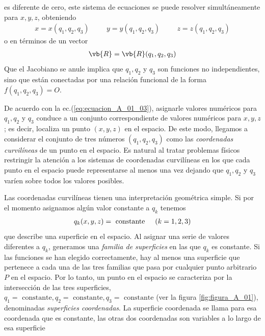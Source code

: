 es diferente de cero, este sistema de ecuaciones se puede resolver simultáneamente para $x, y, z$, obteniendo
\begin{align}
x = x (q_{1}, q_{2}, q_ {3}) \hspace{1cm} y = y (q_{1}, q_{2}, q_ {3}) \hspace{1cm} z = z (q_{1}, q_{2}, q_ {3})
\label{eq:ecuacion_A_01_03}    
\end{align}
o en términos de un vector
\begin{align*}
\vb{R} = \vb{R} (q_{1}, q_{2}, q_{3})
\end{align*}
Que el Jacobiano se anule implica que $q_{1}, q_{2}$ y $q_{3}$ son funciones no independientes, sino que están conectadas por una relación funcional de la forma $f (q_{1}, q_{2}, q_{3}) = O$.
\par
De acuerdo con la ec.(\ref{eq:ecuacion_A_01_03}), asignarle valores numéricos para $q_{1}, q_{2}$ y $q_{3}$ conduce a un conjunto correspondiente de valores numéricos para $x, y, z$; es decir, localiza un punto $(x, y, z)$ en el espacio. De este modo, llegamos a considerar el conjunto de tres números $(q_{1}, q_{2}, q_{3})$ como las \emph{coordenadas curvilíneas} de un punto en el espacio. Es natural al tratar problemas físicos restringir la atención a los sistemas de coordenadas curvilíneas en los que cada punto en el espacio puede representarse al menos una vez dejando que $q_{1}, q_{2}$ y $q_{3}$ varíen sobre todos los valores posibles.
\par
Las coordenadas curvilíneas tienen una interpretación geométrica simple. Si por el momento asignamos algún valor constante a $q_{k}$ tenemos
\begin{align*}
q_{k} (x, y, z) = \mbox{ constante} \hspace{0.5cm} (k = 1, 2, 3)
\end{align*}
 que describe una superficie en el espacio. Al asignar una serie de valores diferentes a $q_{k}$, generamos una \emph{familia de superficies} en las que $q_{k}$ es constante. Si las funciones se han elegido correctamente, hay al menos una superficie que pertenece a cada una de las tres familias que pasa por cualquier punto arbitrario $P$ en el espacio. Por lo tanto, un punto en el espacio se caracteriza por la intersección de las tres superficies, $q_{1} = \mbox{ constante}, q_{2} = \mbox{ constante}, q_{3} = \mbox{ constante}$ (ver la figura \ref{fig:figura_A_01}), denominadas \emph{superficies coordenadas}. La superficie coordenada se llama para esa coordenada que es constante, las otras dos coordenadas son variables a lo largo de esa superficie

